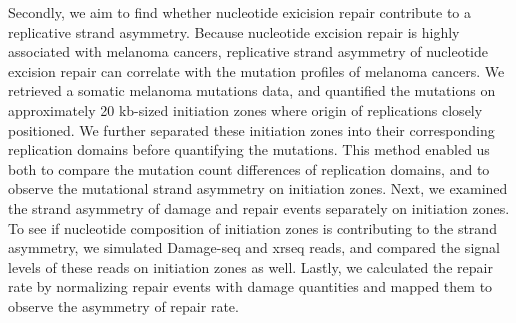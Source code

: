 Secondly, we aim to find whether nucleotide exicision repair contribute to a replicative strand asymmetry. Because nucleotide excision repair is highly associated with melanoma cancers, replicative strand asymmetry of nucleotide excision repair can correlate with the mutation profiles of melanoma cancers. We retrieved a somatic melanoma mutations data, and quantified the mutations on approximately 20 kb-sized initiation zones where origin of replications closely positioned. We further separated these initiation zones into their corresponding replication domains before quantifying the mutations. This method enabled us both to compare the mutation count differences of replication domains, and to observe the mutational strand asymmetry on initiation zones. Next, we examined the strand asymmetry of damage and repair events separately on initiation zones. To see if nucleotide composition of initiation zones is contributing to the strand asymmetry, we simulated Damage-seq and \gls{xrseq} reads, and compared the signal levels of these reads on initiation zones as well. Lastly, we calculated the repair rate by normalizing repair events with damage quantities and mapped them to observe the asymmetry of repair rate.